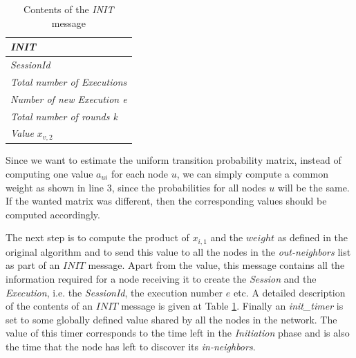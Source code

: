 \documentclass[a4paper,11pt,twoside]{report}
\begin{document}
\begin{description}
	\begin{table}
	\centering
\begin{tabular}{|l|}
		     	   	\hline
		     	   \textbf{\textit{INIT}}\\
		     	   	\hline
		     	   	\hline
		     	   	 \textit{SessionId}\\
		     	     \textit{Total number of Executions}\\
		     	     \textit{Number of new Execution e}\\
		     	     \textit{Total number of rounds k}\\
		     	      \textit{Value} $x_{v,2}$\\
		     	       \hline
		     	   \end{tabular} 
		     	   \caption{Contents of the \textit{INIT} message}
		     	   \label{table:init_msg}
	\end{table}

		     

	Since we want to estimate the uniform transition probability matrix, instead of computing one value $a_{ui}$ for each node $u$, we can simply compute a common weight as shown in line 3, since the probabilities for all nodes $u$ will be the same. If the wanted matrix was different, then the corresponding values should be computed accordingly. 
	
	The next step is to compute the product of $x_{i,1}$ and the $weight$ as defined in the original algorithm and to send this value to all the nodes in the \textit{out-neighbors} list as part of an $INIT$ message. Apart from the value, this message contains all the information required for a node receiving it to create the \textit{Session} and the \textit{Execution}, i.e. the \textit{SessionId}, the execution number $e$ etc. A detailed description of the contents of an $INIT$ message is given at Table \ref{table:init_msg}. Finally an \textit{init\_timer} is set to some globally defined value shared by all the nodes in the network. The value of this timer corresponds to the time left in the \textit{Initiation} phase and is also the time that the node has left to discover its \textit{in-neighbors}.
				

\end{description}
\end{document}
